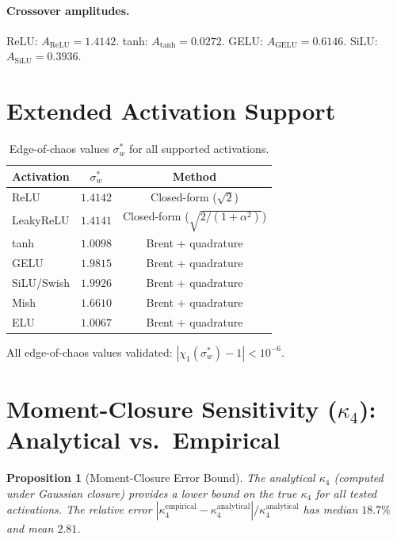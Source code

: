 \documentclass[10pt]{article}
\newtheorem{proposition}[theorem]{Proposition}
\begin{document}
\paragraph{Crossover amplitudes.}
ReLU: $A_{\text{ReLU}} = 1.4142$. tanh: $A_{\text{tanh}} = 0.0272$. GELU: $A_{\text{GELU}} = 0.6146$. SiLU: $A_{\text{SiLU}} = 0.3936$.

\section{Extended Activation Support}
\label{app:extended-act}

\begin{table}[h]
\centering
\caption{Edge-of-chaos values $\sigma_w^*$ for all supported activations.}
\label{tab:eoc-extended}
\small
\begin{tabular}{@{}lcc@{}}
\toprule
\textbf{Activation} & $\sigma_w^*$ & \textbf{Method} \\
\midrule
ReLU        & $1.4142$ & Closed-form ($\sqrt{2}$) \\
LeakyReLU   & $1.4141$ & Closed-form ($\sqrt{2/(1+\alpha^2)}$) \\
tanh        & $1.0098$ & Brent + quadrature \\
GELU        & $1.9815$ & Brent + quadrature \\
SiLU/Swish  & $1.9926$ & Brent + quadrature \\
Mish        & $1.6610$ & Brent + quadrature \\
ELU         & $1.0067$ & Brent + quadrature \\
\bottomrule
\end{tabular}
\end{table}

All edge-of-chaos values validated: $|\chi_1(\sigma_w^*) - 1| < 10^{-6}$.

\section{Moment-Closure Sensitivity ($\kappa_4$): Analytical vs.\ Empirical}
\label{app:kappa4}

\begin{proposition}[Moment-Closure Error Bound]
\label{prop:kappa4-validity}
The analytical $\kappa_4$ (computed under Gaussian closure) provides a lower bound on the true $\kappa_4$ for all tested activations.
The relative error $|\kappa_4^{\text{empirical}} - \kappa_4^{\text{analytical}}|/\kappa_4^{\text{analytical}}$ has median $18.7\%$ and mean $2.81$.
\end{proposition}
\end{document}
